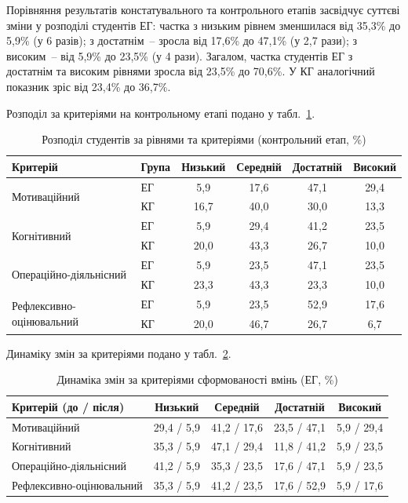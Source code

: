 Порівняння результатів констатувального та контрольного етапів засвідчує суттєві зміни у розподілі студентів ЕГ: частка з низьким рівнем зменшилася від 35,3\% до 5,9\% (у 6 разів); з достатнім~-- зросла від 17,6\% до 47,1\% (у 2,7 рази); з високим~-- від 5,9\% до 23,5\% (у 4 рази). Загалом, частка студентів ЕГ з достатнім та високим рівнями зросла від 23,5\% до 70,6\%. У КГ аналогічний показник зріс від 23,4\% до 36,7\%.

Розподіл за критеріями на контрольному етапі подано у табл.~\ref{tab:kontrol_detail}.

\begin{table}[!h]
\caption{Розподіл студентів за рівнями та критеріями (контрольний етап, \%)}
\label{tab:kontrol_detail}
\centering
\small
\begin{tabular}{|l|l|c|c|c|c|}
\hline
\textbf{Критерій} & \textbf{Група} & \textbf{Низький} & \textbf{Середній} & \textbf{Достатній} & \textbf{Високий} \\
\hline
\multirow{2}{*}{Мотиваційний} & ЕГ & 5,9 & 17,6 & 47,1 & 29,4 \\
\cline{2-6}
 & КГ & 16,7 & 40,0 & 30,0 & 13,3 \\
\hline
\multirow{2}{*}{Когнітивний} & ЕГ & 5,9 & 29,4 & 41,2 & 23,5 \\
\cline{2-6}
 & КГ & 20,0 & 43,3 & 26,7 & 10,0 \\
\hline
\multirow{2}{*}{Операційно-діяльнісний} & ЕГ & 5,9 & 23,5 & 47,1 & 23,5 \\
\cline{2-6}
 & КГ & 23,3 & 43,3 & 23,3 & 10,0 \\
\hline
\multirow{2}{*}{Рефлексивно-оцінювальний} & ЕГ & 5,9 & 23,5 & 52,9 & 17,6 \\
\cline{2-6}
 & КГ & 20,0 & 46,7 & 26,7 & 6,7 \\
\hline
\end{tabular}
\end{table}

Динаміку змін за критеріями подано у табл.~\ref{tab:dynamics}.

\begin{table}[!h]
\caption{Динаміка змін за критеріями сформованості вмінь (ЕГ, \%)}
\label{tab:dynamics}
\centering
\small
\begin{tabular}{|l|c|c|c|c|}
\hline
\hfill \textbf{Критерій (до / після)} & \textbf{Низький} & \textbf{Середній} & \textbf{Достатній} & \textbf{Високий} \\
\hline
Мотиваційний & 29,4 / 5,9 & 41,2 / 17,6 & 23,5 / 47,1 & 5,9 / 29,4 \\
\hline
Когнітивний & 35,3 / 5,9 & 47,1 / 29,4 & 11,8 / 41,2 & 5,9 / 23,5 \\
\hline
Операційно-діяльнісний & 41,2 / 5,9 & 35,3 / 23,5 & 17,6 / 47,1 & 5,9 / 23,5 \\
\hline
Рефлексивно-оцінювальний & 35,3 / 5,9 & 41,2 / 23,5 & 17,6 / 52,9 & 5,9 / 17,6 \\
\hline
\end{tabular}
\end{table}

